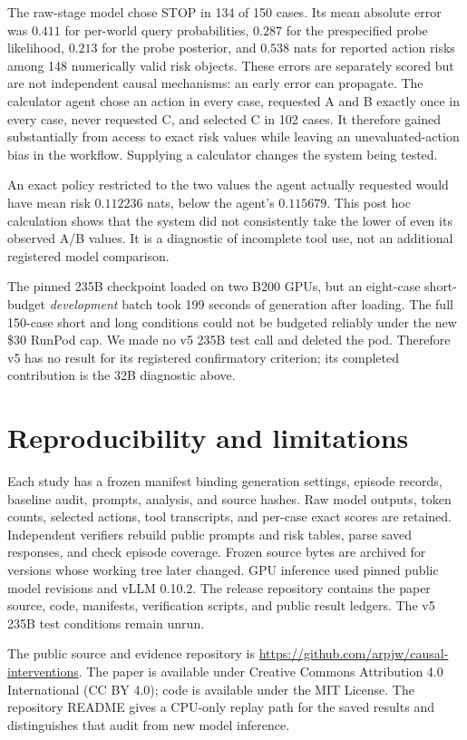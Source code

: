 \documentclass[10pt]{article}
\begin{document}
The raw-stage model chose STOP in 134 of 150 cases. Its mean absolute error was $0.411$ for per-world query probabilities, $0.287$ for the prespecified probe likelihood, $0.213$ for the probe posterior, and $0.538$ nats for reported action risks among 148 numerically valid risk objects. These errors are separately scored but are not independent causal mechanisms: an early error can propagate. The calculator agent chose an action in every case, requested A and B exactly once in every case, never requested C, and selected C in 102 cases. It therefore gained substantially from access to exact risk values while leaving an unevaluated-action bias in the workflow. Supplying a calculator changes the system being tested.

An exact policy restricted to the two values the agent actually requested would have mean risk $0.112236$ nats, below the agent's $0.115679$. This post hoc calculation shows that the system did not consistently take the lower of even its observed A/B values. It is a diagnostic of incomplete tool use, not an additional registered model comparison.

The pinned 235B checkpoint loaded on two B200 GPUs, but an eight-case short-budget \emph{development} batch took 199 seconds of generation after loading. The full 150-case short and long conditions could not be budgeted reliably under the new \$30 RunPod cap. We made no v5 235B test call and deleted the pod. Therefore v5 has no result for its registered confirmatory criterion; its completed contribution is the 32B diagnostic above.

\section{Reproducibility and limitations}
Each study has a frozen manifest binding generation settings, episode records, baseline audit, prompts, analysis, and source hashes. Raw model outputs, token counts, selected actions, tool transcripts, and per-case exact scores are retained. Independent verifiers rebuild public prompts and risk tables, parse saved responses, and check episode coverage. Frozen source bytes are archived for versions whose working tree later changed. GPU inference used pinned public model revisions and vLLM 0.10.2. The release repository contains the paper source, code, manifests, verification scripts, and public result ledgers. The v5 235B test conditions remain unrun.

The public source and evidence repository is \url{https://github.com/arpjw/causal-interventions}. The paper is available under Creative Commons Attribution 4.0 International (CC BY 4.0); code is available under the MIT License. The repository README gives a CPU-only replay path for the saved results and distinguishes that audit from new model inference.
\end{document}
